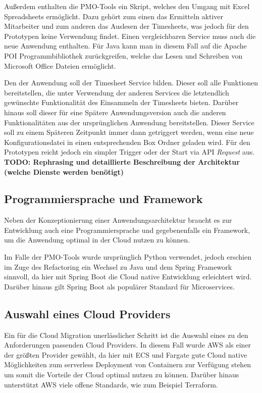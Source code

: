 Außerdem enthalten die PMO-Tools ein \grqq{} Skript, welches den Umgang mit Excel Spreadsheets ermöglicht. Dazu gehört zum einen das Ermitteln aktiver Mitarbeiter und zum anderen das Auslesen der Timesheets, was jedoch für den Prototypen keine Verwendung findet. Einen vergleichbaren Service muss auch die neue Anwendung enthalten. Für Java kann man in diesem Fall auf die Apache POI Programmbibliothek zurückgreifen, welche das Lesen und Schreiben von Microsoft Office Dateien ermöglicht.

Den \grqq{} der Anwendung soll der Timesheet Service bilden. Dieser soll alle Funktionen bereitstellen, die unter Verwendung der anderen Services die letztendlich gewünschte Funktionalität des Einsammeln der Timesheets bieten. Darüber hinaus soll dieser für eine Spätere Anwendungsversion auch die anderen Funktionalitäten aus der ursprünglichen Anwendung bereitstellen. Dieser Service soll zu einem Späteren Zeitpunkt immer dann getriggert werden, wenn eine neue Konfigurationsdatei in einen entsprechenden \gls{Box} Ordner geladen wird. Für den Prototypen reicht jedoch ein simpler Trigger oder der Start via \ac{API} \textit{Request} aus. \textbf{TODO: Rephrasing und detaillierte Beschreibung der Architektur (welche Dienste werden benötigt)}\pagebreak

\subsection{Programmiersprache und Framework}
Neben der Konzeptionierung einer Anwendungsarchitektur braucht es zur Entwicklung auch eine Programmiersprache und gegebenenfalls ein Framework, um die Anwendung optimal in der Cloud nutzen zu können. 

Im Falle der PMO-Tools wurde ursprünglich Python verwendet, jedoch erschien im Zuge des Refactoring ein Wechsel zu Java und dem \gls{Spring} Framework sinnvoll, da hier mit \gls{Spring Boot} die Cloud native Entwicklung erleichtert wird. Darüber hinaus gilt \gls{Spring Boot} als populärer Standard für Microservices.

\subsection{Auswahl eines Cloud Providers}
Ein für die Cloud Migration unerlässlicher Schritt ist die Auswahl eines zu den Anforderungen passenden Cloud Providers. In diesem Fall wurde \ac{AWS} als einer der größten Provider gewählt, da hier mit \ac{ECS} und Fargate gute Cloud native Möglichkeiten zum serverless Deployment von Containern zur Verfügung stehen um somit die Vorteile der Cloud optimal nutzen zu können. Darüber hinaus unterstützt \ac{AWS} viele offene Standards, wie zum Beispiel Terraform.

